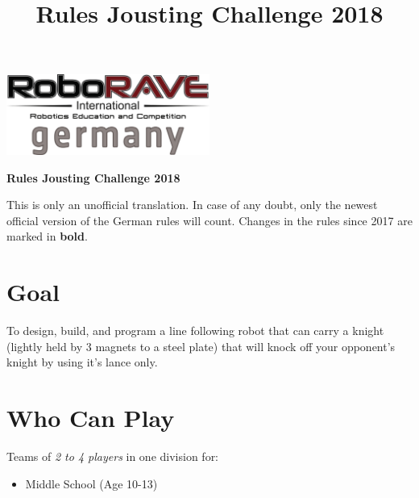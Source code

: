 \documentclass[a4paper,12pt]{article}
\begin{document}
\title{Rules Jousting Challenge 2018}

 \begin{center}
\includegraphics[width=0.5\textwidth]{logo.png}

\huge                      %
\bfseries                   %
Rules Jousting Challenge 2018
  \end{center}
  This is only an unofficial translation. In case of any doubt, only the newest official version of the German rules will
  count. Changes in the rules since 2017 are marked in \textbf{bold}.
\section{Goal}
To design, build, and program a line following robot that can carry a knight (lightly held by 3
magnets to a steel plate) that will knock off your opponent’s knight by using it’s lance only.
\section{Who Can Play}
Teams of \emph{2 to 4 players} in one division for:
\begin{itemize}
	\item Middle School (Age 10-13)
\end{itemize}
\end{document}
